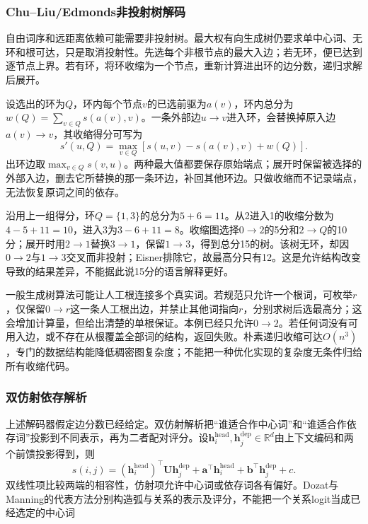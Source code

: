 \subsubsection{Chu--Liu/Edmonds非投射树解码}
\label{sec:nlp-analysis-mst}

自由词序和远距离依赖可能需要非投射树。最大权有向生成树仍要求单中心词、无环和根可达，只是取消投射性。先选每个非根节点的最大入边；若无环，便已达到逐节点上界。若有环，将环收缩为一个节点，重新计算进出环的边分数，递归求解后展开。

设选出的环为$Q$，环内每个节点$v$的已选前驱为$a(v)$，环内总分为$w(Q)=\sum_{v\in Q}s(a(v),v)$。一条外部边$u\to v$进入环，会替换掉原入边$a(v)\to v$，其收缩得分可写为
\begin{equation}
 s'(u,Q)=\max_{v\in Q}
   [s(u,v)-s(a(v),v)+w(Q)].
 \label{eq:nlp-analysis-mst-contract}
\end{equation}
出环边取$\max_{v\in Q}s(v,u)$。两种最大值都要保存原始端点；展开时保留被选择的外部入边，删去它所替换的那一条环边，补回其他环边。只做收缩而不记录端点，无法恢复原词之间的依存。

沿用上一组得分，环$Q=\{1,3\}$的总分为$5+6=11$。从2进入1的收缩分数为$4-5+11=10$，进入3为$3-6+11=8$。收缩图选择$0\to2$的5分和$2\to Q$的10分；展开时用$2\to1$替换$3\to1$，保留$1\to3$，得到总分15的树。该树无环，却因$0\to2$与$1\to3$交叉而非投射；Eisner排除它，故最高分只有12。这是允许结构改变导致的结果差异，不能据此说15分的语言解释更好。

一般生成树算法可能让人工根连接多个真实词。若规范只允许一个根词，可枚举$r$，仅保留$0\to r$这一条人工根出边，并禁止其他词指向$r$，分别求树后选最高分；这会增加计算量，但给出清楚的单根保证。本例已经只允许$0\to2$。若任何词没有可用入边，或不存在从根覆盖全部词的结构，返回失败。朴素递归收缩可达$O(n^3)$，专门的数据结构能降低稠密图复杂度；不能把一种优化实现的复杂度无条件归给所有收缩代码。

\subsubsection{双仿射依存解析}
\label{sec:nlp-analysis-biaffine}

上述解码器假定边分数已经给定。双仿射解析把“谁适合作中心词”和“谁适合作依存词”投影到不同表示，再为二者配对评分。设$\bm h_i^{\mathrm{head}},\bm h_j^{\mathrm{dep}}\in\mathbb R^d$由上下文编码和两个前馈投影得到，则
\begin{equation}
 s(i,j)=
 (\bm h_i^{\mathrm{head}})^\top\bm U\bm h_j^{\mathrm{dep}}
 +\bm a^\top\bm h_i^{\mathrm{head}}
 +\bm b^\top\bm h_j^{\mathrm{dep}}+c.
 \label{eq:nlp-analysis-biaffine}
\end{equation}
双线性项比较两端的相容性，仿射项允许中心词或依存词各有偏好。Dozat与Manning的代表方法分别构造弧与关系的表示及评分，不能把一个关系logit当成已经选定的中心词

